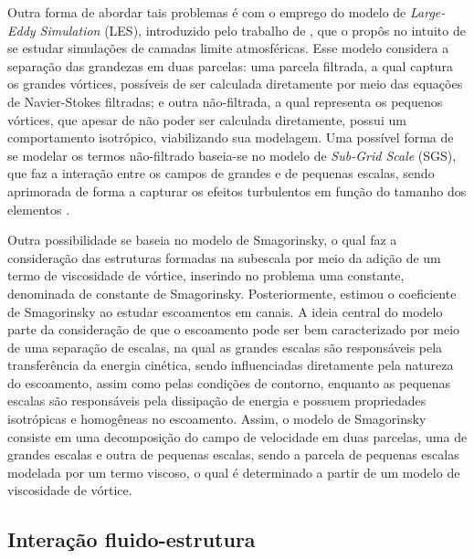 Outra forma de abordar tais problemas é com o emprego do modelo de \textit{Large-Eddy Simulation} (LES), introduzido pelo trabalho de , que o propôs no intuito de se estudar simulações de camadas limite atmosféricas. Esse modelo considera a separação das grandezas em duas parcelas: uma parcela filtrada, a qual captura os grandes vórtices, possíveis de ser calculada diretamente por meio das equações de Navier-Stokes filtradas; e outra não-filtrada, a qual representa os pequenos vórtices, que apesar de não poder ser calculada diretamente, possui um comportamento isotrópico, viabilizando sua modelagem. Uma possível forma de se modelar os termos não-filtrado baseia-se no modelo de \textit{Sub-Grid Scale} (SGS), que faz a interação entre os campos de grandes e de pequenas escalas, sendo aprimorada de forma a capturar os efeitos turbulentos em função do tamanho dos elementos \cite{ghosal1995basic,hughes2000large,moeng2015large}.

Outra possibilidade se baseia no modelo de Smagorinsky, o qual faz a consideração das estruturas formadas na subescala por meio da adição de um termo de viscosidade de vórtice, inserindo no problema uma constante, denominada de constante de Smagorinsky. Posteriormente,  estimou o coeficiente de Smagorinsky ao estudar escoamentos em canais. A ideia central do modelo parte da consideração de que o escoamento pode ser bem caracterizado por meio de uma separação de escalas, na qual as grandes escalas são responsáveis pela transferência da energia cinética, sendo influenciadas diretamente pela natureza do escoamento, assim como pelas condições de contorno, enquanto as pequenas escalas são responsáveis pela dissipação de energia e possuem propriedades isotrópicas e homogêneas no escoamento. Assim, o modelo de Smagorinsky consiste em uma decomposição do campo de velocidade em duas parcelas, uma de grandes escalas e outra de pequenas escalas, sendo a parcela de pequenas escalas modelada por um termo viscoso, o qual é determinado a partir de um modelo de viscosidade de vórtice.

\subsection{Interação fluido-estrutura} \label{IFE}

